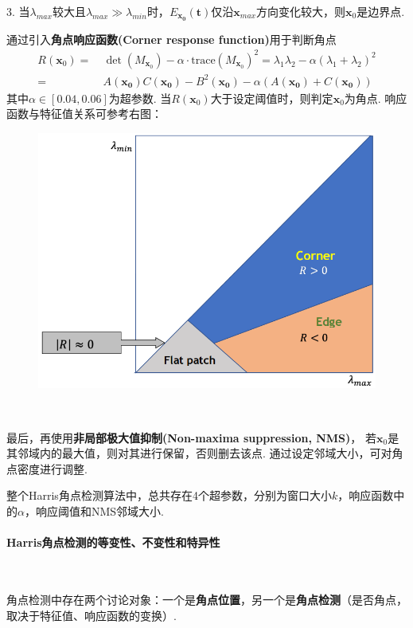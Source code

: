 \documentclass[12pt, a4paper, oneside]{ctexart}
\numberwithin{equation}{section}  %
\theoremstyle{definition}
\def\bd{\boldsymbol}        %
\begin{document}
3. 当$\lambda_{max}$较大且$\lambda_{max}\gg\lambda_{min}$时，$E_{\bd{x_0}}(\bd{t})$仅沿$\bd{x}_{max}$方向变化较大，则$\bd{x}_0$是边界点.

通过引入\textbf{角点响应函数(Corner response function)}用于判断角点
\begin{align*}
    R(\bd{x}_0) =&\ \det(M_{\bd{x}_0}) - \alpha\cdot\text{trace}(M_{\bd{x}_0})^2 = \lambda_1\lambda_2 - \alpha(\lambda_1+\lambda_2)^2\\
    =&\ A(\bd{x_0})C(\bd{x_0}) - B^2(\bd{x_0}) - \alpha(A(\bd{x_0})+C(\bd{x_0}))
\end{align*}
其中$\alpha\in[0.04,0.06]$为超参数. 当$R(\bd{x}_0)$大于设定阈值时，则判定$\bd{x}_0$为角点. 响应函数与特征值关系可参考右图：\vspace{-1cm}

\begin{figure} %
    \hspace{-1.4cm}
    \includegraphics[scale=0.5]{Harris角点相应函数.png}
\end{figure}
\ \vspace{1cm}

最后，再使用\textbf{非局部极大值抑制(Non-maxima suppression, NMS)}，
若$\bd{x}_0$是其邻域内的最大值，则对其进行保留，否则删去该点. 通过设定邻域大小，可对角点密度进行调整.

整个Harris角点检测算法中，总共存在4个超参数，分别为窗口大小$k$，响应函数中的$\alpha$，响应阈值和NMS邻域大小.

\paragraph{Harris角点检测的等变性、不变性和特异性}\ \par
角点检测中存在两个讨论对象：一个是\textbf{角点位置}，另一个是\textbf{角点检测}（是否角点，取决于特征值、响应函数的变换）.
\end{document}
